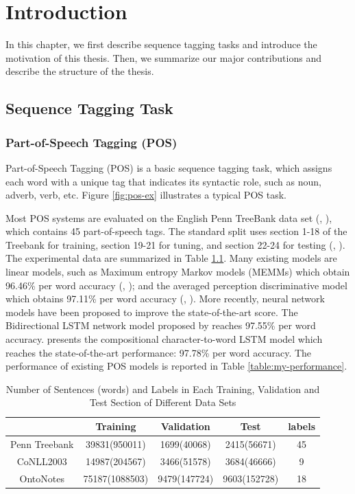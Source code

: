 \chapter{Introduction}

In this chapter, we first describe sequence tagging tasks and introduce the motivation of this thesis. Then, we summarize our major contributions and describe the structure of the thesis.

\section{Sequence Tagging Task}

\subsection{Part-of-Speech Tagging (POS)}
Part-of-Speech Tagging (POS) is a basic sequence tagging task, which assigns each word with a unique tag that indicates its syntactic role, such as noun, adverb, verb, etc. Figure \ref{fig:pos-ex} illustrates a typical POS task. 

Most POS systems are evaluated on the English Penn TreeBank data set (\citeauthor{marcus1993building}, \citeyear{marcus1993building}), which contains 45 part-of-speech tags. The standard split uses section 1-18 of the Treebank for training, section 19-21 for tuning, and section 22-24 for testing (\citeauthor{toutanova2003feature}, \citeyear{toutanova2003feature}). The experimental data are summarized in Table \ref{table:my-dataset}. Many existing models are linear models, such as Maximum entropy Markov models (MEMMs) which obtain 96.46\% per word accuracy (\citeauthor{mccallum2000maximum}, \citeyear{mccallum2000maximum}); and the averaged perception discriminative model which obtains 97.11\% per word accuracy (\citeauthor{collins2002discriminative}, \citeyear{collins2002discriminative}). More recently, neural network models have been proposed to improve the state-of-the-art score. The Bidirectional LSTM network model proposed by \cite{huang2015bidirectional} reaches 97.55\% per word accuracy. \cite{ling2015finding} presents the compositional character-to-word LSTM model which reaches the state-of-the-art performance: 97.78\% per word accuracy. The performance of existing POS models is reported in Table \ref{table:my-performance}.

\begin{table}[]
\centering
\caption{Number of Sentences (words) and Labels in Each Training, Validation and Test Section of Different Data Sets}
\label{table:my-dataset}
\begin{tabular}{|c|c|c|c|c|} \hline
      & Training  & Validation  & Test  & labels  \\ \hline
Penn Treebank   &39831(950011) &1699(40068) &2415(56671) &45\\\hline
CoNLL2003   &14987(204567) &3466(51578) &3684(46666) &9     \\\hline
OntoNotes   &75187(1088503) &9479(147724) &9603(152728) &18     \\\hline
\end{tabular}
\end{table}


